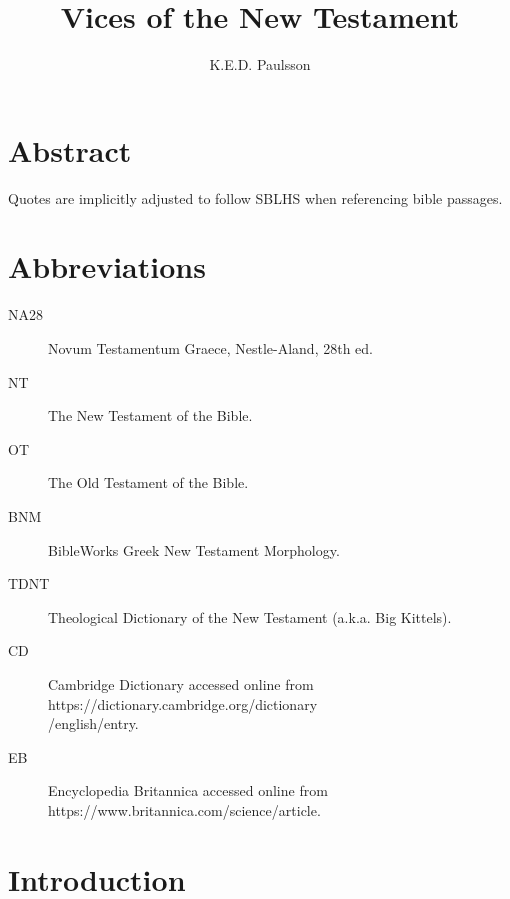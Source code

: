 \documentclass[a4paper,twocolumn,twoside,notitlepage,10pt]{article}
\title{Vices of the New Testament}
\author{K.E.D. Paulsson}
\begin{document}
\frenchspacing
\newcommand{\entlbl}[1]{\index[eng]{#1}\label{itm:#1}}
\newcommand{\entref}[1]{\emph{#1} ~($\rightarrow$~p.~\pageref{itm:#1})}
\newcommand{\grc}[1]{\greektext{#1}\latintext}
\newcommand{\cdfoot}[2]{\footnote{\emph{CD}, s.v. ``{#1},'' accessed \printdate{#2}.}}
\newcommand{\bkfoot}[3]{\footnote{{#3}, ``{#1},'' \emph{TDNT} {#2}.}}
\newcommand{\bksfoot}[2]{\footnote{{#2}, \emph{TDNT} {#1}.}}

\maketitle

\section*{Abstract}

Quotes are implicitly adjusted to follow SBLHS when referencing bible passages.

\section{Abbreviations}
\begin{description}
    \item[NA28] Novum Testamentum Graece, Nestle-Aland, 28th ed.
	\item[NT] The New Testament of the Bible.
	\item[OT] The Old Testament of the Bible.
	\item[BNM] BibleWorks Greek New Testament Morphology.
	\item[TDNT] Theological Dictionary of the New Testament (a.k.a. Big Kittels).
	\item[CD] Cambridge Dictionary accessed online from https://dictionary.cambridge.org/dictionary\\/english/\textlangle entry\textrangle.
	\item[EB] Encyclopedia Britannica accessed online from https://www.britannica.com/science/\textlangle article\textrangle.
\end{description}

\section{Introduction}
\end{document}
